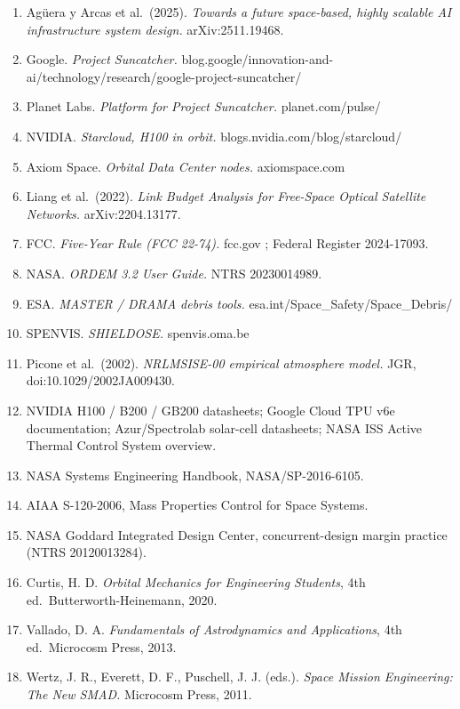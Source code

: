 \documentclass[
  11pt,
  openany,
  oneside]{book}
\providecommand{\tightlist}{%
  \setlength{\itemsep}{0pt}\setlength{\parskip}{0pt}}
\begin{document}
\begin{enumerate}
\def\labelenumi{\arabic{enumi}.}
\tightlist
\item
  Agüera y Arcas et al.~(2025). \emph{Towards a future space-based,
  highly scalable AI infrastructure system design.} arXiv:2511.19468.
\item
  Google. \emph{Project Suncatcher.}
  blog.google/innovation-and-ai/technology/research/google-project-suncatcher/
\item
  Planet Labs. \emph{Platform for Project Suncatcher.} planet.com/pulse/
\item
  NVIDIA. \emph{Starcloud, H100 in orbit.}
  blogs.nvidia.com/blog/starcloud/
\item
  Axiom Space. \emph{Orbital Data Center nodes.} axiomspace.com
\item
  Liang et al.~(2022). \emph{Link Budget Analysis for Free-Space Optical
  Satellite Networks.} arXiv:2204.13177.
\item
  FCC. \emph{Five-Year Rule (FCC 22-74).} fcc.gov ; Federal Register
  2024-17093.
\item
  NASA. \emph{ORDEM 3.2 User Guide.} NTRS 20230014989.
\item
  ESA. \emph{MASTER / DRAMA debris tools.}
  esa.int/Space\_Safety/Space\_Debris/
\item
  SPENVIS. \emph{SHIELDOSE.} spenvis.oma.be
\item
  Picone et al.~(2002). \emph{NRLMSISE-00 empirical atmosphere model.}
  JGR, doi:10.1029/2002JA009430.
\item
  NVIDIA H100 / B200 / GB200 datasheets; Google Cloud TPU v6e
  documentation; Azur/Spectrolab solar-cell datasheets; NASA ISS Active
  Thermal Control System overview.
\item
  NASA Systems Engineering Handbook, NASA/SP-2016-6105.
\item
  AIAA S-120-2006, Mass Properties Control for Space Systems.
\item
  NASA Goddard Integrated Design Center, concurrent-design margin
  practice (NTRS 20120013284).
\item
  Curtis, H. D. \emph{Orbital Mechanics for Engineering Students}, 4th
  ed.~Butterworth-Heinemann, 2020.
\item
  Vallado, D. A. \emph{Fundamentals of Astrodynamics and Applications},
  4th ed.~Microcosm Press, 2013.
\item
  Wertz, J. R., Everett, D. F., Puschell, J. J. (eds.). \emph{Space
  Mission Engineering: The New SMAD.} Microcosm Press, 2011.

\end{enumerate}
\end{document}
